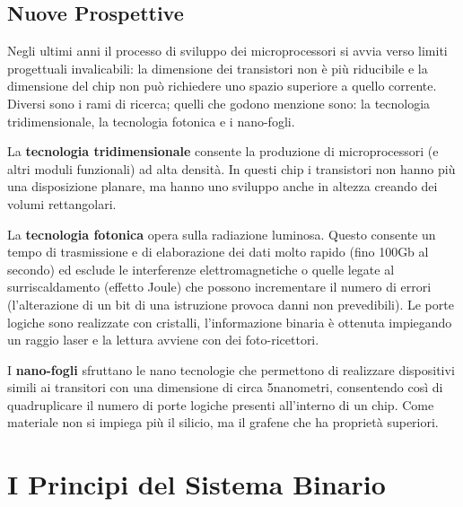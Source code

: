 \documentclass[12pt]{article}
\begin{document}
\subsection{Nuove Prospettive}
Negli ultimi anni il processo di sviluppo dei microprocessori si avvia verso limiti progettuali invalicabili: la dimensione dei transistori non è più riducibile e la dimensione del chip non può richiedere uno spazio superiore a quello corrente. Diversi sono i rami di ricerca; quelli che godono menzione sono: la tecnologia tridimensionale, la tecnologia fotonica e i nano-fogli.\par\medskip\noindent
La \textbf{tecnologia tridimensionale} consente la produzione di microprocessori (e altri moduli funzionali) ad alta densità. In questi chip i transistori non hanno più una disposizione planare, ma hanno uno sviluppo anche in altezza creando dei volumi rettangolari.\par\medskip\noindent
La \textbf{tecnologia fotonica} opera sulla radiazione luminosa. Questo consente un tempo di trasmissione e di elaborazione dei dati molto rapido (fino 100Gb al secondo) ed esclude le interferenze elettromagnetiche o quelle legate al surriscaldamento (effetto Joule) che possono incrementare il numero di errori (l’alterazione di un bit di una istruzione provoca danni non prevedibili). Le porte logiche sono realizzate con cristalli, l’informazione binaria è ottenuta impiegando un raggio laser e la lettura avviene con dei foto-ricettori. \par\medskip\noindent
I \textbf{nano-fogli} sfruttano le nano tecnologie che permettono di realizzare dispositivi simili ai transitori con una dimensione di circa 5nanometri, consentendo così di quadruplicare il numero di porte logiche presenti all’interno di un chip. Come materiale non si impiega più il silicio, ma il grafene che ha proprietà superiori.\par\medskip\noindent
\newpage
\section{I Principi del Sistema Binario}
\end{document}
